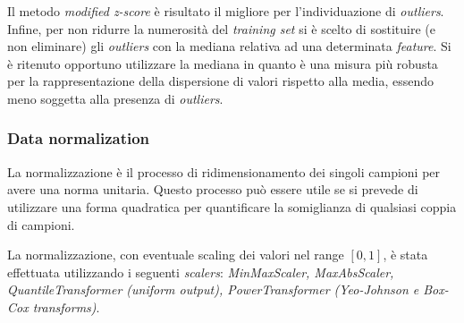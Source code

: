                         Il metodo \textit{modified z-score} è risultato il migliore per l'individuazione di \textit{outliers}. Infine, per non ridurre la numerosità del \textit{training set} si è scelto di sostituire (e non eliminare) gli \textit{outliers} con la mediana relativa ad una determinata \textit{feature}. Si è ritenuto opportuno utilizzare la mediana in quanto è una misura più robusta per la rappresentazione della dispersione di valori rispetto alla media, essendo meno soggetta alla presenza di \textit{outliers}.                        
                
                \subsubsection{Data normalization}
                
                La normalizzazione è il processo di ridimensionamento dei singoli campioni per avere una norma unitaria. Questo processo può essere utile se si prevede di utilizzare una forma quadratica per quantificare la somiglianza di qualsiasi coppia di campioni.
                
                La normalizzazione, con eventuale scaling dei valori nel range $[0, 1]$, è stata effettuata utilizzando i seguenti \textit{scalers}: \textit{MinMaxScaler, MaxAbsScaler, QuantileTransformer (uniform output), PowerTransformer (Yeo-Johnson e Box-Cox transforms)}.
                
